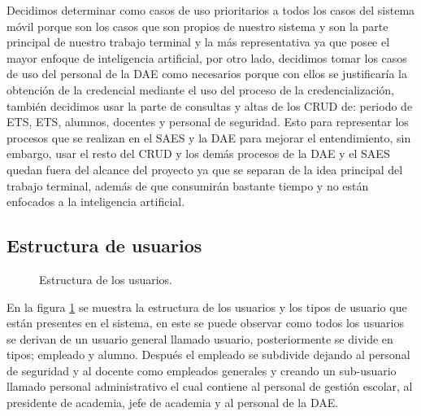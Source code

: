Decidimos determinar como casos de uso prioritarios a todos los casos del sistema móvil porque son los casos que son propios de nuestro sistema y son la parte principal de nuestro trabajo terminal y la más representativa ya que posee el mayor enfoque de inteligencia artificial, por otro lado, decidimos tomar los casos de uso del personal de la DAE como necesarios porque con ellos se justificaría la obtención de la credencial mediante el uso del proceso de la credencialización, también decidimos usar la parte de consultas y altas de los CRUD de: periodo de ETS, ETS, alumnos, docentes y personal de seguridad. Esto para representar los procesos que se realizan en el SAES y la DAE para mejorar el entendimiento, sin embargo, usar el resto del CRUD y los demás procesos de la DAE y el SAES quedan fuera del alcance del proyecto ya que se separan de la idea principal del trabajo terminal, además de que consumirán bastante tiempo y no están enfocados a la inteligencia artificial.

\subsection{Estructura de usuarios }

\begin{figure}[htbp!]
	\begin{center}
		\caption{Estructura de los usuarios.}
		\label{fig:EstructuraU}
	\end{center}
\end{figure} 

En la figura \ref{fig:EstructuraU} se muestra la estructura de los usuarios y los tipos de usuario que están presentes en el sistema, en este se puede observar como todos los usuarios se derivan de un usuario general llamado usuario, posteriormente se divide en tipos; empleado y alumno. Después el empleado se subdivide dejando al personal de seguridad y al docente como empleados generales y creando un sub-usuario llamado personal administrativo el cual contiene al personal de gestión escolar, al presidente de academia, jefe de academia y al personal de la DAE. 

